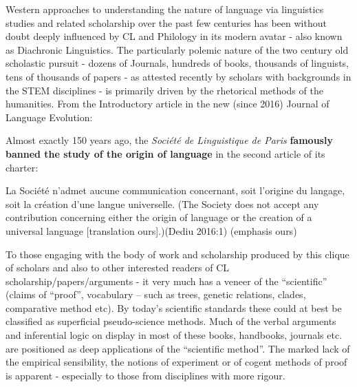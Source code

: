 \vskip 6pt

Western approaches to understanding the nature of language via linguistics studies and related scholarship over the past few centuries has been without doubt deeply influenced by CL and Philology in its modern avatar - also known as Diachronic Linguistics. The particularly polemic nature of the two century old scholastic pursuit - dozens of Journals, hundreds of books, thousands of linguists, tens of thousands of papers - as attested recently by scholars with backgrounds in the STEM disciplines - is primarily driven by the rhetorical methods of the humanities. From the Introductory article in the new (since 2016) Journal of Language Evolution:

\vskip 2pt

\begin{myquote}
Almost exactly 150 years ago, the \textit{Société de Linguistique de Paris} \textbf{famously banned the study of the origin of language} in the second article of its charter:
\end{myquote}

\vskip 2pt

\begin{myquote}
La Société n’admet aucune communication concernant, soit l’origine du langage, soit la création d’une langue universelle. (The Society does not accept any contribution concerning either the origin of language or the creation of a universal language [translation ours].)(Dediu 2016:1) (emphasis ours)
\end{myquote}

\vskip 3pt

To those engaging with the body of work and scholarship produced by this clique of scholars and also to other interested readers of CL scholarship/papers/arguments - it very much has a veneer of the “scientific” (claims of “proof”, vocabulary – such as trees, genetic relations, clades, comparative method etc). By today’s scientific standards these could at best be classified as superficial pseudo-science methods. Much of the verbal arguments and inferential logic on display in most of these books, handbooks, journals etc. are positioned as deep applications of the “scientific method”. The marked lack of the empirical sensibility, the notions of experiment or of cogent methods of proof is apparent - especially to those from disciplines with more rigour.

